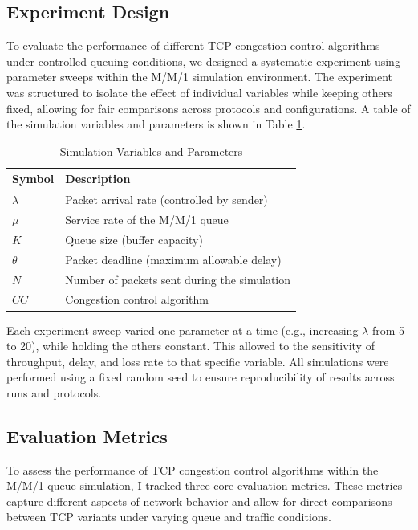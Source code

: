 \documentclass[conference]{IEEEtran}
\begin{document}
\subsection{Experiment Design}
To evaluate the performance of different TCP congestion control algorithms under controlled queuing conditions, we designed a systematic experiment using parameter sweeps within the M/M/1 simulation environment. 
The experiment was structured to isolate the effect of individual variables while keeping others fixed, allowing for fair comparisons across protocols and configurations.
A table of the simulation variables and parameters is shown in Table \ref{tab:variables}.

\begin{table}[h!]
    \centering
    \caption{Simulation Variables and Parameters}
    \begin{tabular}{ll}
    \toprule
    \textbf{Symbol} & \textbf{Description} \\
    \midrule
    $ \lambda $ & Packet arrival rate (controlled by sender) \\
    $ \mu $ & Service rate of the M/M/1 queue \\
    $ K $ & Queue size (buffer capacity) \\
    $ \theta $ & Packet deadline (maximum allowable delay) \\
    $ N $ & Number of packets sent during the simulation \\
    $ CC $ & Congestion control algorithm \\
    \bottomrule
    \end{tabular}
    \label{tab:variables}
\end{table}

\noindent Each experiment sweep varied one parameter at a time (e.g., increasing $\lambda$ from 5 to 20), while holding the others constant. 
This allowed to the sensitivity of throughput, delay, and loss rate to that specific variable. 
All simulations were performed using a fixed random seed to ensure reproducibility of results across runs and protocols.

\subsection{Evaluation Metrics}
To assess the performance of TCP congestion control algorithms within the M/M/1 queue simulation, I tracked three core evaluation metrics. 
These metrics capture different aspects of network behavior and allow for direct comparisons between TCP variants under varying queue and traffic conditions.
\end{document}
